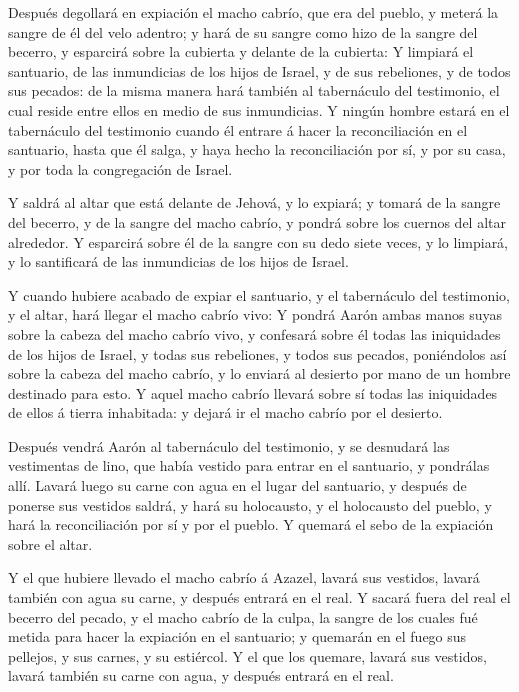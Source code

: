  Después degollará en expiación el macho cabrío, que era
del pueblo, y meterá la sangre de él del velo adentro; y hará de su
sangre como hizo de la sangre del becerro, y esparcirá sobre la cubierta
y delante de la cubierta:  Y limpiará el santuario, de las
inmundicias de los hijos de Israel, y de sus rebeliones, y de todos sus
pecados: de la misma manera hará también al tabernáculo del testimonio,
el cual reside entre ellos en medio de sus inmundicias.  Y
ningún hombre estará en el tabernáculo del testimonio cuando él entrare
á hacer la reconciliación en el santuario, hasta que él salga, y haya
hecho la reconciliación por sí, y por su casa, y por toda la
congregación de Israel.

 Y saldrá al altar que está delante de Jehová, y lo
expiará; y tomará de la sangre del becerro, y de la sangre del macho
cabrío, y pondrá sobre los cuernos del altar alrededor.  Y
esparcirá sobre él de la sangre con su dedo siete veces, y lo limpiará,
y lo santificará de las inmundicias de los hijos de Israel.

 Y cuando hubiere acabado de expiar el santuario, y el
tabernáculo del testimonio, y el altar, hará llegar el macho cabrío
vivo:  Y pondrá Aarón ambas manos suyas sobre la cabeza del
macho cabrío vivo, y confesará sobre él todas las iniquidades de los
hijos de Israel, y todas sus rebeliones, y todos sus pecados,
poniéndolos así sobre la cabeza del macho cabrío, y lo enviará al
desierto por mano de un hombre destinado para esto.  Y
aquel macho cabrío llevará sobre sí todas las iniquidades de ellos á
tierra inhabitada: y dejará ir el macho cabrío por el desierto.

 Después vendrá Aarón al tabernáculo del testimonio, y se
desnudará las vestimentas de lino, que había vestido para entrar en el
santuario, y pondrálas allí.  Lavará luego su carne con
agua en el lugar del santuario, y después de ponerse sus vestidos
saldrá, y hará su holocausto, y el holocausto del pueblo, y hará la
reconciliación por sí y por el pueblo.  Y quemará el sebo
de la expiación sobre el altar.

 Y el que hubiere llevado el macho cabrío á Azazel, lavará
sus vestidos, lavará también con agua su carne, y después entrará en el
real.  Y sacará fuera del real el becerro del pecado, y el
macho cabrío de la culpa, la sangre de los cuales fué metida para hacer
la expiación en el santuario; y quemarán en el fuego sus pellejos, y sus
carnes, y su estiércol.  Y el que los quemare, lavará sus
vestidos, lavará también su carne con agua, y después entrará en el
real.

